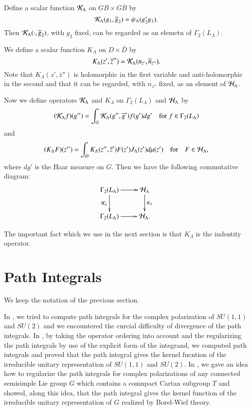 Define a scalar function $\mathcal{K}_{\Lambda}$ on $ GB \times G\overline{B}$ by
$$
\mathcal{K}_{\Lambda}(g_{1}, \overline{g}_{2})= \psi_{\Lambda}(g_{2}^{*}g_{1}).
$$
Then $\mathcal{K}_{\Lambda}(\cdot, \overline{g}_{2})$, with $g_{2}$ fixed, can be regarded as an elemetn of $\Gamma_{2}(L_{\Lambda})$.

We define a scalar function $K_{\Lambda}$ on $D \times \overline{D}$ by
$$
K_{\Lambda}(z', \overline{z}'') = \mathcal{K}_{\Lambda}(n_{z'}, \overline{n}_{z''}).
$$
Note that $K_{\Lambda}(z', \overline{z}'')$ is holomorphic in the first variable and anti-holomorphic in the second and that it can be regarded, with $n_{z''}$ fixed, as an element of $\mathcal{H}_{\Lambda}$.

Now we define operators $\mathcal{K}_{\Lambda}$ and $K_{\Lambda}$ on $\Gamma_{2}(L_{\Lambda})$ and $\mathcal{H}_{\Lambda}$ by
$$
(\mathcal{K}_{\Lambda}f)(g'')= \int_{G}\mathcal{K}_{\Lambda}(g'', \overline{g}')f(g')dg' \quad \text{for}\; f\in \Gamma_{2}(L_{\Lambda})
$$
and
$$
(K_{\Lambda}F)(z'') = \int_{D}K_{\Lambda}(z'', \overline{z}')F(z')J_{\Lambda}(z')d\mu(z') \quad \text{for} \quad F\in \mathcal{H}_{\Lambda},
$$
where $dg'$ is the Haar measure on $G$. Then we have the following commutative diagram:
$$
\xymatrix{
\Gamma_{2}(L_{\Lambda})\ar[r]\ar[d]_-{\calK_{\Lambda}} &\calH_{\Lambda}\ar[d]^-{K_{\Lambda}}\\
\Gamma_{2}(L_{\Lambda})\ar[r] & \calH_{\Lambda}.
}
$$

The important fact which we use in the next section is that $K_{\Lambda}$ is the indentity operator.

\section{Path Integrals}\label{art15-sec-3}
We keep the notation of the previous section.

In \cite{art15-key5}, we tried to compute path integrals for the complex polarization of $SU(1,1)$ and $SU(2)$ and we encountered the curcial difficulty of divergence of the path integrals. In \cite{art15-key6}, by taking the operator ordering into account and the regularizing the path integrals by use of the explicit form of the integrand, we computed path integrals and proved that the path integral gives the kernel fucntion of the irreducible unitary representation of $SU(1,1)$ and $SU(2)$. In \cite{art15-key7}, we gave an idea how to regularize the path integrals for complex polarizations of any connected semisimple Lie group $G$ which contains a comnpact Cartan subgroup $T$ and showed, along this idea, that the path integral gives the kernel function of the irreducible unitary representation of $G$ realized by Borel-Wiel theory.

